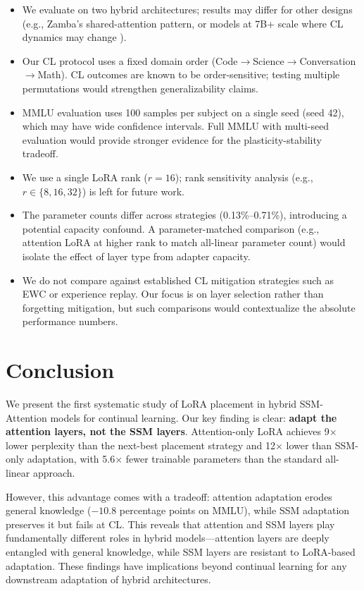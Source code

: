 \documentclass{article}
\begin{document}
\begin{itemize}
    \item We evaluate on two hybrid architectures; results may differ for other designs (e.g., Zamba's shared-attention pattern, or models at 7B+ scale where CL dynamics may change \cite{biderman2024}).
    \item Our CL protocol uses a fixed domain order (Code$\to$Science$\to$Conversation$\to$Math). CL outcomes are known to be order-sensitive; testing multiple permutations would strengthen generalizability claims.
    \item MMLU evaluation uses 100 samples per subject on a single seed (seed 42), which may have wide confidence intervals. Full MMLU with multi-seed evaluation would provide stronger evidence for the plasticity-stability tradeoff.
    \item We use a single LoRA rank ($r=16$); rank sensitivity analysis (e.g., $r \in \{8, 16, 32\}$) is left for future work.
    \item The parameter counts differ across strategies (0.13\%--0.71\%), introducing a potential capacity confound. A parameter-matched comparison (e.g., attention LoRA at higher rank to match all-linear parameter count) would isolate the effect of layer type from adapter capacity.
    \item We do not compare against established CL mitigation strategies such as EWC \cite{kirkpatrick2017overcoming} or experience replay. Our focus is on layer selection rather than forgetting mitigation, but such comparisons would contextualize the absolute performance numbers.
\end{itemize}

\section{Conclusion}

We present the first systematic study of LoRA placement in hybrid SSM-Attention models for continual learning. Our key finding is clear: \textbf{adapt the attention layers, not the SSM layers}. Attention-only LoRA achieves 9$\times$ lower perplexity than the next-best placement strategy and 12$\times$ lower than SSM-only adaptation, with 5.6$\times$ fewer trainable parameters than the standard all-linear approach.

However, this advantage comes with a tradeoff: attention adaptation erodes general knowledge ($-10.8$ percentage points on MMLU), while SSM adaptation preserves it but fails at CL. This reveals that attention and SSM layers play fundamentally different roles in hybrid models---attention layers are deeply entangled with general knowledge, while SSM layers are resistant to LoRA-based adaptation. These findings have implications beyond continual learning for any downstream adaptation of hybrid architectures.
\end{document}
